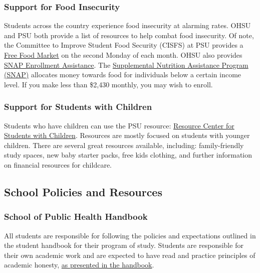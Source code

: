 \documentclass[
  letterpaper,
  DIV=11,
  numbers=noendperiod]{scrartcl}
\begin{document}
\hypertarget{support-for-food-insecurity}{%
\subsubsection{Support for Food
Insecurity}\label{support-for-food-insecurity}}

Students across the country experience food insecurity at alarming
rates. OHSU and PSU both provide a list of resources to help combat food
insecurity. Of note, the Committee to Improve Student Food Security
(CISFS) at PSU provides a
\href{https://www.pdx.edu/student-access-center/free-food-market}{Free
Food Market} on the second Monday of each month. OHSU also provides
\href{https://o2.ohsu.edu/student-central/health-wellness/student-food-resources/snap.cfm}{SNAP
Enrollment Assistance}. The
\href{https://oregonhunger.org/snap-for-students/}{Supplemental
Nutrition Assistance Program (SNAP)} allocates money towards food for
individuals below a certain income level. If you make less than \$2,430
monthly, you may wish to enroll.

\hypertarget{support-for-students-with-children}{%
\subsubsection{Support for Students with
Children}\label{support-for-students-with-children}}

Students who have children can use the PSU resource:
\href{https://www.pdx.edu/students-with-children/}{Resource Center for
Students with Children}. Resources are mostly focused on students with
younger children. There are several great resources available,
including: family-friendly study spaces, new baby starter packs, free
kids clothing, and further information on financial resources for
childcare.

\hypertarget{school-policies-and-resources}{%
\subsection{School Policies and
Resources}\label{school-policies-and-resources}}

\hypertarget{school-of-public-health-handbook}{%
\subsubsection{School of Public Health
Handbook}\label{school-of-public-health-handbook}}

All students are responsible for following the policies and expectations
outlined in the student handbook for their program of study. Students
are responsible for their own academic work and are expected to have
read and practice principles of academic honesty,
\href{https://ohsu-psu-sph.org/current-graduate-students/policies-procedures/}{as
presented in the handbook}.
\end{document}
